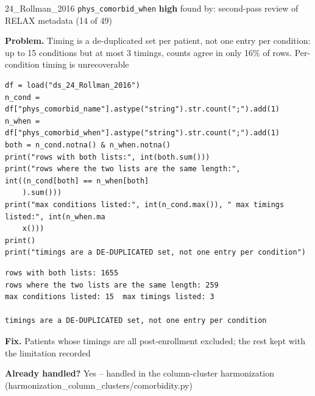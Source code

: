 \documentclass[9pt, t, handout]{beamer}
\newcommand{\ans}[1]{\textcolor{structure.fg}{#1}}
\begin{document}
\begin{frame}[fragile]{24\_Rollman\_2016 \quad \texttt{phys\_comorbid\_when}}
  {\scriptsize\textcolor{orange!80!black}{\textbf{high}} \quad
   found by: second-pass review of RELAX metadata \quad (14 of 49)}
  \vspace{3pt}

  {\footnotesize \textbf{Problem.} Timing is a de-duplicated set per patient, not one entry per condition: up to 15 conditions but at most 3 timings, counts agree in only 16\% of rows. Per-condition timing is unrecoverable}
  \vspace{4pt}

  \begin{Verbatim}[fontsize=\tiny, frame=single, framesep=2pt, label=\tiny reproduce]
df = load("ds_24_Rollman_2016")
n_cond = df["phys_comorbid_name"].astype("string").str.count(";").add(1)
n_when = df["phys_comorbid_when"].astype("string").str.count(";").add(1)
both = n_cond.notna() & n_when.notna()
print("rows with both lists:", int(both.sum()))
print("rows where the two lists are the same length:", int((n_cond[both] == n_when[both]
    ).sum()))
print("max conditions listed:", int(n_cond.max()), " max timings listed:", int(n_when.ma
    x()))
print()
print("timings are a DE-DUPLICATED set, not one entry per condition")
  \end{Verbatim}
  \begin{Verbatim}[fontsize=\tiny, frame=single, framesep=2pt, label=\tiny output]
rows with both lists: 1655
rows where the two lists are the same length: 259
max conditions listed: 15  max timings listed: 3

timings are a DE-DUPLICATED set, not one entry per condition
  \end{Verbatim}
  \vspace{2pt}

  {\footnotesize \textbf{Fix.} Patients whose timings are all post-enrollment excluded; the rest kept with the limitation recorded}
  \vspace{2pt}

  {\footnotesize \textbf{Already handled?} \ans{Yes} -- handled in the column-cluster harmonization
   (harmonization\_column\_clusters/comorbidity.py)}
\end{frame}
\end{document}
